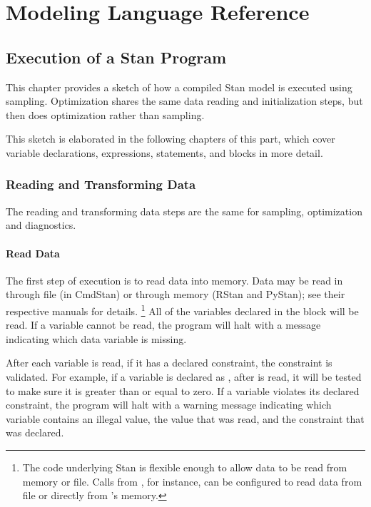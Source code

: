 

\part{Modeling Language Reference}

\chapter{Execution of a Stan Program}

\noindent
This chapter provides a sketch of how a compiled Stan model is
executed using sampling.  Optimization shares the same data reading
and initialization steps, but then does optimization rather than sampling.

This sketch is elaborated in the following chapters of this part,
which cover variable declarations, expressions, statements, and blocks
in more detail.


\section{Reading and Transforming Data}

The reading and transforming data steps are the same for sampling,
optimization and diagnostics.

\subsection{Read Data}

The first step of execution is to read data into memory.   Data may be
read in through file (in CmdStan) or through memory (RStan and
PyStan);  see their respective manuals for details.%
%
\footnote{The \Cpp code underlying Stan is flexible enough to allow
  data to be read from memory or file.  Calls from \R, for instance,
  can be configured to read data from file or directly from \R's
  memory.}
%
All of the variables declared in the  block will be read.
If a variable cannot be read, the program will halt with a message
indicating which data variable is missing.

After each variable is read, if it has a declared constraint, the
constraint is validated.  For example, if a variable  is
declared as , after  is read, it will be tested
to make sure it is greater than or equal to zero.  If a variable
violates its declared constraint, the program will halt with a warning
message indicating which variable contains an illegal value, the value
that was read, and the constraint that was declared.

